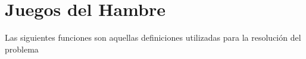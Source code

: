 \section{Juegos del Hambre}

    Las siguientes funciones son aquellas definiciones utilizadas para la resolución del problema
  
    